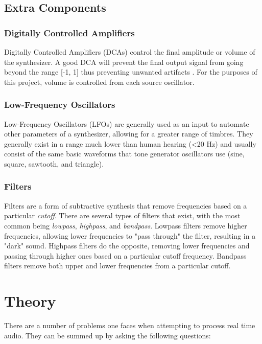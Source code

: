 \documentclass[12pt]{article}
\begin{document}
\subsection{Extra Components}

\subsubsection*{Digitally Controlled Amplifiers}
Digitally Controlled Amplifiers (DCAs) control the final amplitude or volume of the synthesizer. A good DCA will prevent the final output signal from going beyond the range [-1, 1] thus preventing unwanted artifacts \cite{Pirkle_2015}. For the purposes of this project, volume is controlled from each source oscillator.

\subsubsection*{Low-Frequency Oscillators}
Low-Frequency Oscillators (LFOs) are generally used as an input to automate other parameters of a synthesizer, allowing for a greater range of timbres. They generally exist in a range much lower than human hearing (\textless 20 Hz) and usually consist of the same basic waveforms that tone generator oscillators use (sine, square, sawtooth, and triangle).

\subsubsection*{Filters}
Filters are a form of subtractive synthesis that remove frequencies based on a particular \textit{cutoff}. There are several types of filters that exist, with the most common being \textit{lowpass}, \textit{highpass}, and \textit{bandpass}. Lowpass filters remove higher frequencies, allowing lower frequencies to "pass through" the filter, resulting in a "dark" sound. Highpass filters do the opposite, removing lower frequencies and passing through higher ones based on a particular cutoff frequency. Bandpass filters remove both upper and lower frequencies from a particular cutoff.

\newpage
\section{Theory}

There are a number of problems one faces when attempting to process real time audio. They can be summed up by asking the following questions:
\end{document}
